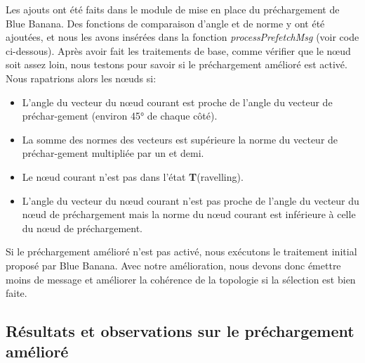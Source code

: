 
\par Les ajouts ont été faits dans le module de mise en place du préchargement de Blue Banana. Des fonctions de comparaison d'angle et de norme y ont été ajoutées, et nous les avons insérées dans la fonction \textit{processPrefetchMsg} (voir code ci-dessous). Après avoir fait les traitements de base, comme vérifier que le nœud soit assez loin, nous testons pour savoir si le préchargement amélioré est activé. 
\newline
\\ Nous rapatrions alors les nœuds si:
        \begin{itemize}
        \renewcommand{\labelitemi}{$\bullet$}
                \item L'angle du vecteur du nœud courant est proche de l'angle du vecteur de préchar-gement (environ 45° de chaque côté).
		\item La somme des normes des vecteurs est supérieure la norme du vecteur de préchar-gement multipliée par un et demi. 
                \item Le nœud courant n'est pas dans l'état \textbf{T}(ravelling).
		\item L'angle du vecteur du nœud courant n'est pas proche de l'angle du vecteur du nœud de préchargement mais la norme du nœud courant est inférieure à celle du nœud de préchargement. 
        \end{itemize}
Si le préchargement amélioré n'est pas activé, nous exécutons le traitement initial proposé par Blue Banana. Avec notre amélioration, nous devons donc émettre moins de message et améliorer la cohérence de la topologie si la sélection est bien faite. 

\lstset{numbers=left,basicstyle=\scriptsize, numberstyle=\tiny, stepnumber=5, numbersep=5pt}




\subsection{Résultats et observations sur le préchargement amélioré}

